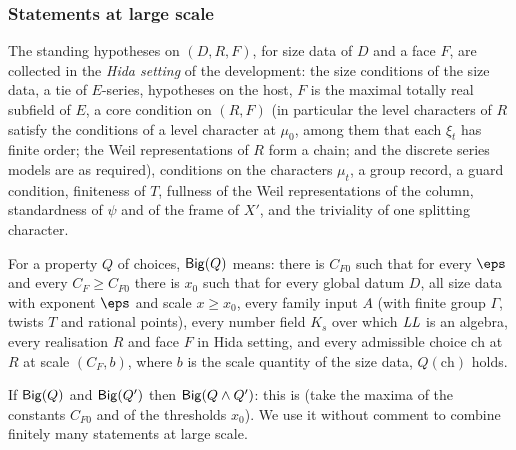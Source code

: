 \subsubsection{Statements at large scale}
\begin{definition}\label{def:pf:rowprops:hida}
The standing hypotheses on $(D,R,F)$, for size data of $D$ and a face $F$, are collected in the \emph{Hida setting} of
the development: the size conditions of the size data, a tie of $E$-series, hypotheses on the host, $F$ is the maximal
totally real subfield of $E$, a core condition on $(R,F)$ (in particular the level characters of $R$ satisfy the
conditions of a level character at $\mu_0$, among them that each $\xi_t$ has finite order; the Weil representations of
$R$ form a chain; and the discrete series models are as required), conditions on the characters $\mu_t$, a group
record, a guard condition, finiteness of $T$, fullness of the Weil representations of the column, standardness of $\psi$
and of the frame of $X'$, and the triviality of one splitting character.
\end{definition}

\begin{definition}\label{def:pf:rowprops:big}
For a property $Q$ of choices, $\mathsf{Big}(Q)$ means: there is $C_{F0}$ such that for every $\eps$ and every
$C_F\ge C_{F0}$ there is $x_0$ such that for every global datum $D$, all size data with exponent $\eps$ and scale
$x\ge x_0$, every family input $A$ (with finite group $\Gamma$, twists $T$ and rational points), every number field $K_s$
over which $\mathit{LL}$ is an algebra, every realisation $R$ and face $F$ in Hida setting, and every admissible choice
$\mathrm{ch}$ at $R$ at scale $(C_F,b)$, where $b$ is the scale quantity of the size data, $Q(\mathrm{ch})$ holds.
\end{definition}

If $\mathsf{Big}(Q)$ and $\mathsf{Big}(Q')$ then $\mathsf{Big}(Q\wedge Q')$: this is 
(take the maxima of the constants $C_{F0}$ and of the thresholds $x_0$). We use it without comment to combine finitely
many statements at large scale.

